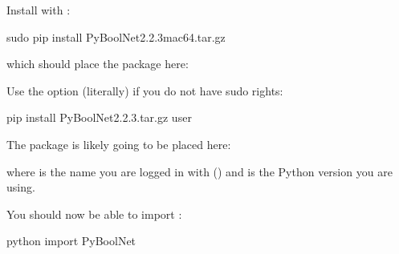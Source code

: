 \documentclass[letterpaper,10pt,english]{sphinxmanual}
\begin{document}
Install  with :

\begin{sphinxVerbatim}[commandchars=\\\{\}]
\PYGZdl{} sudo pip install PyBoolNet\PYGZhy{}2.2.3\PYGZus{}mac64.tar.gz
\end{sphinxVerbatim}

which should place the package here:

\begin{sphinxVerbatim}[commandchars=\\\{\}]
\end{sphinxVerbatim}

Use the option  (literally) if you do not have sudo rights:

\begin{sphinxVerbatim}[commandchars=\\\{\}]
\PYGZdl{} pip install PyBoolNet\PYGZhy{}2.2.3.tar.gz \PYGZhy{}\PYGZhy{}user
\end{sphinxVerbatim}

The package is likely going to be placed here:

\begin{sphinxVerbatim}[commandchars=\\\{\}]
\end{sphinxVerbatim}

where  is the name you are logged in with () and  is the Python version you are using.

You should now be able to import :

\begin{sphinxVerbatim}[commandchars=\\\{\}]
\PYGZdl{} python
\PYGZgt{}\PYGZgt{}\PYGZgt{} import PyBoolNet
\end{sphinxVerbatim}
\end{document}
